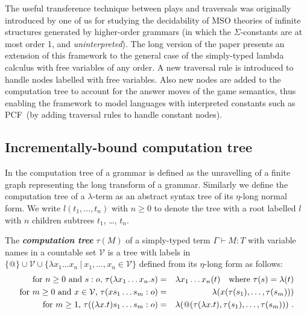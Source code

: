 \documentclass{llncs}
\newcommand\defname[1]{{\bf\em #1}\index{#1}}
\newcommand\union{\cup}
\newcommand\pcf{\textsf{PCF}}
\begin{document}
The useful transference technique between plays and traversals was
originally introduced by one of us \cite{OngLics2006} for studying the
decidability of MSO theories of infinite structures generated by
higher-order grammars (in which the $\Sigma$-constants are at most
order 1, and \emph{uninterpreted}).
The long version of the paper presents an extension of this framework to the general case of the simply-typed lambda calculus with free variables of any order. A new traversal rule is introduced to handle nodes labelled with free variables. Also new nodes are added to the computation tree to account for the answer moves of the game semantics, thus enabling the framework to model languages with interpreted constants such as \pcf~(by adding traversal rules to handle constant nodes).

\subsection*{Incrementally-bound computation tree}

In \cite{OngLics2006} the computation tree of a grammar is defined as
the unravelling of a finite graph representing the long transform of a
grammar. Similarly we define the computation tree of a $\lambda$-term
as an abstract syntax tree of its $\eta$-long normal form.  We write
$l(t_1, \ldots, t_n)$ with $n \geq 0$ to denote the tree with a root
labelled $l$ with $n$ children subtrees $t_1$, \ldots, $t_n$.

\begin{definition}\rm
\label{dfn:comptree}
  The \defname{computation tree} $\tau(M)$ of a simply-typed term
  $\Gamma \vdash M:T$ with variable names in a countable set
  $\mathcal{V}$ is a tree with labels in $ \{ @ \} \union \mathcal{V}
  \union \{ \lambda x_1 \ldots x_n \ | \ x_1 ,\ldots, x_n \in
  \mathcal{V} \}$ defined from its $\eta$-long form as follows:
\begin{eqnarray*}
  \mbox{for $n\geq 0$ and $s:o$, } \tau(\lambda x_1 \ldots x_n . s) &=& \lambda x_1 \ldots x_n(t) \mbox{\quad where $\tau(s) = \lambda(t)$}\\
  \mbox{for $m\geq 0$ and $x \in  \mathcal{V}$, } \tau( x s_1 \ldots s_m : o) &=&  \lambda (x(\tau(s_1),\ldots,\tau(s_m)))\\
  \mbox{for $m \geq 1$, } \tau((\lambda x.t) s_1 \ldots s_m :o) &=& \lambda (@(\tau(\lambda x.t),\tau(s_1),\ldots,\tau(s_m))) \ .
\end{eqnarray*}
\end{definition}
\end{document}
